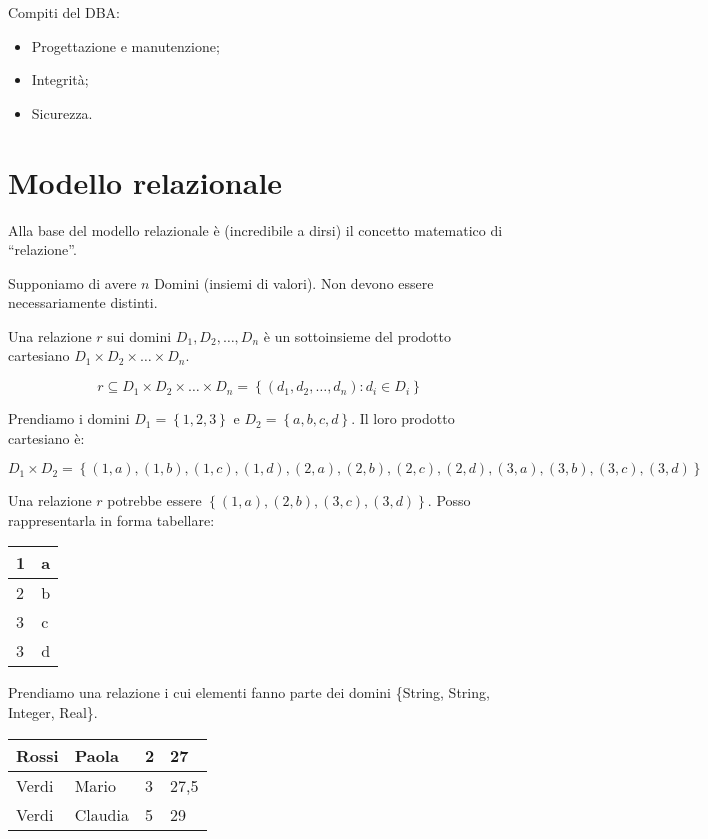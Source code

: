 Compiti del DBA:

\begin{itemize}
    \item Progettazione e manutenzione;
    \item Integrit\`a;
    \item Sicurezza.
\end{itemize}

\chapter{Modello relazionale}

Alla base del modello relazionale \`e (incredibile a dirsi) il concetto matematico di ``relazione''.

Supponiamo di avere $n$ Domini (insiemi di valori). Non devono essere necessariamente distinti.

Una relazione $r$ sui domini $D_1, D_2, \dots , D_n$ \`e un sottoinsieme del prodotto cartesiano $ D_1 \times D_2 \times \dots \times D_n $.

\[
r \subseteq D_1 \times D_2 \times \dots \times D_n = 
\left\{ \left( d_1, d_2, \dots , d_n \right) : d_i \in D_i \right\}
\]

Prendiamo i domini $D_1 = \left \{ 1, 2, 3 \right \}$ e $D_2 = \left \{a, b, c, d \right \}$. Il loro prodotto cartesiano \`e:

\[
D_1 \times D_2 = \left \{
(1,a), (1,b), (1,c), (1,d), 
(2,a), (2,b), (2,c), (2,d), 
(3,a), (3,b), (3,c), (3,d)
 \right \}
\]

Una relazione $r$ potrebbe essere $\left \{ (1,a), (2,b) , (3,c) , (3,d) \right \}$. Posso rappresentarla in forma tabellare:

\begin{center}
\begin{tabular}{|l|l|}
\hline
1 & a \\
\hline
2 & b \\
\hline
3 & c \\
\hline
3 & d \\
\hline
\end{tabular}
\end{center}

Prendiamo una relazione i cui elementi fanno parte dei domini \{String, String, Integer, Real\}.

\begin{center}
\begin{tabular}{|l|l|l|l|}
\hline
Rossi & Paola & 2 & 27 \\
\hline
Verdi & Mario & 3 & 27,5 \\
\hline
Verdi & Claudia & 5 & 29 \\
\hline
\end{tabular}
\end{center}

